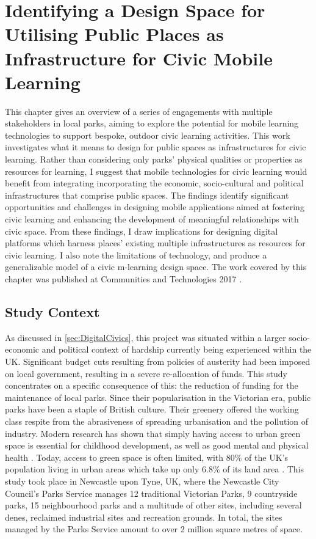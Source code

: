 \chapter{Identifying a Design Space for Utilising Public Places as Infrastructure for Civic Mobile Learning}

This chapter gives an overview of a series of engagements with multiple stakeholders in local parks, aiming to explore the potential for mobile learning technologies to support bespoke, outdoor civic learning activities. This work investigates what it means to design for public spaces as infrastructures for civic learning. Rather than considering only parks' physical qualities or properties as resources for learning, I suggest that mobile technologies for civic learning would benefit from integrating incorporating the economic, socio-cultural and political infrastructures that comprise public spaces. The findings identify significant opportunities and challenges in designing mobile applications aimed at fostering civic learning and enhancing the development of meaningful relationships with civic space. From these findings, I draw implications for designing digital platforms which harness places’ existing multiple infrastructures as resources for civic learning. I also note the limitations of technology, and produce a generalizable model of a civic m-learning design space. The work covered by this chapter was published at Communities and Technologies 2017 \citep{Richardson2017}.

\section{Study Context}
As discussed in \ref{sec:DigitalCivics}, this project was situated within a larger socio-economic and political context of hardship currently being experienced within the UK. Significant budget cuts resulting from policies of austerity had been imposed on local government, resulting in a severe re-allocation of funds. This study concentrates on a specific consequence of this: the reduction of funding for the maintenance of local parks. Since their popularisation in the Victorian era, public parks have been a staple of British culture. Their greenery offered the working class respite from the abrasiveness of spreading urbanisation and the pollution of industry. Modern research has shown that simply having access to urban green space is essential for childhood development, as well as good mental and physical health \citep{Fiennes2015}. Today, access to green space is often limited, with 80\% of the UK’s population living in urban areas which take up only 6.8\% of its land area \citep{UKNationalEcosystemAssesment2011}. This study took place in Newcastle upon Tyne, UK, where the Newcastle City Council's Parks Service manages 12 traditional Victorian Parks, 9 countryside parks, 15 neighbourhood parks and a multitude of other sites, including several denes, reclaimed industrial sites and recreation grounds. In total, the sites managed by the Parks Service amount to over 2 million square metres of space.

